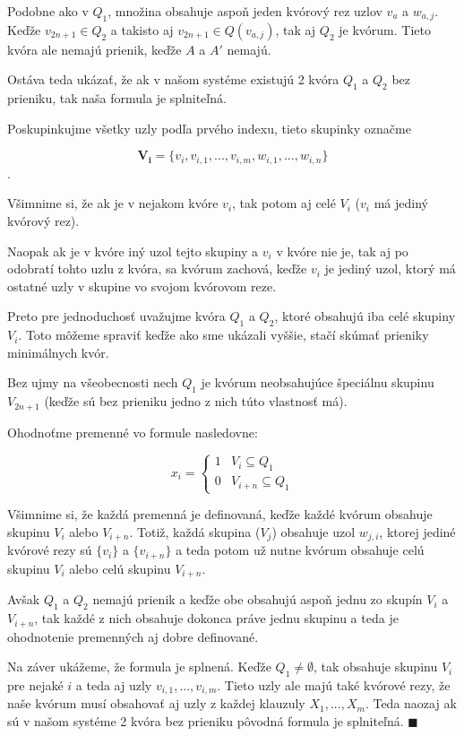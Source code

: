 Podobne ako v $Q_1$, množina obsahuje aspoň jeden kvórový rez uzlov $v_a$ a $w_{a,j}$.
\\
Keďže $v_{2n+1}\in Q_2$ a takisto aj $v_{2n+1}\in Q(v_{a,j})$, tak aj $Q_2$ je kvórum.
Tieto kvóra ale nemajú prienik, keďže $A$ a $A'$ nemajú.

Ostáva teda ukázať, že ak v našom systéme existujú 2 kvóra $Q_1$ a $Q_2$ bez prieniku,
tak naša formula je splniteľná.

Poskupinkujme všetky uzly podľa prvého indexu, tieto skupinky označme

$$\mathbf{V_i}=\{v_i, v_{i,1}, ..., v_{i,m}, w_{i,1}, ..., w_{i,n}\}$$.

Všimnime si, že ak je v nejakom kvóre $v_i$, tak potom aj celé $V_i$
($v_i$ má jediný kvórový rez).

Naopak ak je v kvóre iný uzol tejto skupiny a $v_i$ v kvóre nie je,
tak aj po odobratí tohto uzlu z kvóra, sa kvórum zachová, keďže $v_i$ je jediný uzol,
ktorý má ostatné uzly v skupine vo svojom kvórovom reze.

Preto pre jednoduchosť uvažujme kvóra $Q_1$ a $Q_2$, ktoré obsahujú iba celé skupiny $V_i$.
Toto môžeme spraviť keďže ako sme ukázali vyššie, stačí skúmať prieniky minimálnych kvór.

Bez ujmy na všeobecnosti nech $Q_1$ je kvórum neobsahujúce špeciálnu skupinu
$V_{2n+1}$ (keďže sú bez prieniku jedno z nich túto vlastnosť má).

Ohodnoťme premenné vo formule nasledovne:

$$x_i= \begin{cases}
            1 & V_i \subseteq Q_1 \\
            0 & V_{i+n} \subseteq Q_1
       \end{cases}$$

\vspace{5mm}
Všimnime si, že každá premenná je definovaná, keďže každé kvórum obsahuje skupinu
$V_i$ alebo $V_{i+n}$.
Totiž, každá skupina ($V_j$) obsahuje uzol $w_{j,i}$, ktorej jediné
kvórové rezy sú $\{v_i\}$ a $\{v_{i+n}\}$ a teda potom už nutne kvórum obsahuje
celú skupinu $V_i$ alebo celú skupinu $V_{i+n}$.

Avšak $Q_1$ a $Q_2$ nemajú prienik a keďže obe obsahujú aspoň jednu zo skupín $V_i$
a $V_{i+n}$, tak každé z nich obsahuje dokonca práve jednu skupinu a teda je ohodnotenie
premenných aj dobre definované.

Na záver ukážeme, že formula je splnená.
Keďže $Q_1 \neq \emptyset$, tak obsahuje skupinu $V_i$ pre nejaké $i$
a teda aj uzly $v_{i,1}, ..., v_{i,m}$.
Tieto uzly ale majú také kvórové rezy, že naše kvórum musí obsahovať aj uzly
z každej klauzuly $X_1, ..., X_m$.
Teda naozaj ak sú v našom systéme 2 kvóra bez prieniku pôvodná formula je
splniteľná. $\blacksquare$

